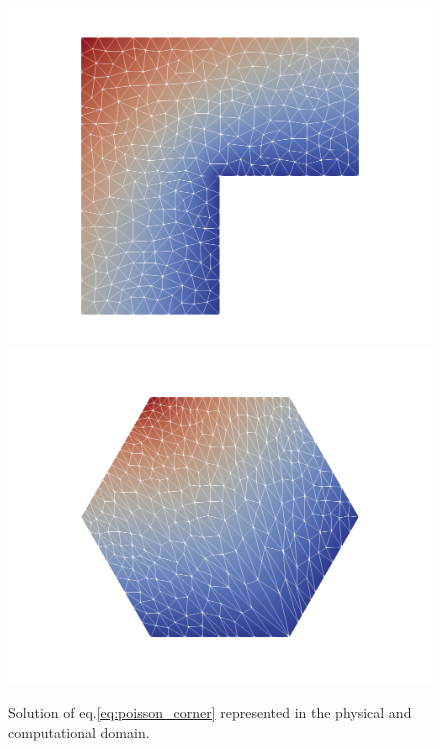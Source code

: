 \documentclass[a4paper,11pt]{article}
\begin{document}
{\begin{figure}[h!]\label{fig:mesh_Winslow}
    \centering
    \includegraphics[scale=0.2]{Images/Test1/r-adaptive/u.png}
    \includegraphics[scale=0.2]{Images/Test1/r-adaptive/u_c.png}
    \caption{Solution of eq.\eqref{eq:poisson_corner} represented in the physical and computational domain.}
    \label{fig:initial_mesh}
\end{figure}

}
\end{document}
